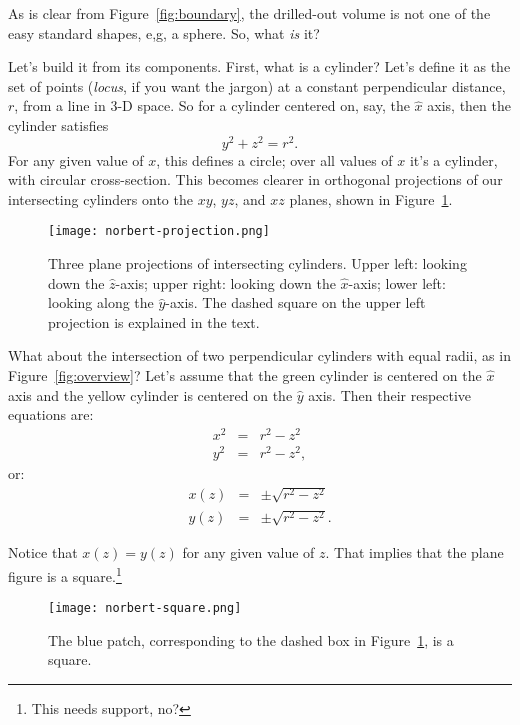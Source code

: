 \documentclass[twocolumn]{article}
\theoremstyle{definition}
\theoremstyle{plain}
\begin{document}
As is clear from Figure~\ref{fig:boundary}, the drilled-out volume is
not one of the easy standard shapes, e,g, a sphere.  So, what
\emph{is} it?

Let's build it from its components.  First, what is a cylinder?  Let's
define it as the set of points (\emph{locus}, if you want the jargon)
at a constant perpendicular distance, $r$, from a line in 3-D space.
So for a cylinder centered on, say, the $\hat{x}$ axis, then the
cylinder satisfies
\begin{equation}
  y^2 + z^2 = r^2.
\end{equation}
\label{eq:cylinder}
For any given value of $x$, this defines a circle; over all values of
$x$ it's a cylinder, with circular cross-section.
This becomes clearer in orthogonal projections of our intersecting
cylinders onto the $xy$, $yz$, and $xz$ planes, shown in
Figure~\ref{fig:projections}.
\begin{figure}
  \texttt{[image: norbert-projection.png]}
  \caption{Three plane projections of intersecting cylinders.  Upper
    left:  looking down the $\hat{z}$-axis; upper right:  looking down
    the $\hat{x}$-axis; lower left:  looking along the
    $\hat{y}$-axis.  The dashed square on the upper left projection is
    explained in the text.}
  \label{fig:projections}
\end{figure}

What about the intersection of two perpendicular cylinders with equal
radii, as in Figure~\ref{fig:overview}?  Let's assume that the green
cylinder is centered on the $\hat{x}$ axis and the yellow cylinder is
centered on the $\hat{y}$ axis.  Then their respective equations are:
\begin{eqnarray*}
  x^2 & = & r^2 - z^2 \\
  y^2 & = & r^2 - z^2,
\end{eqnarray*}
or:
\begin{eqnarray}
  x(z) & = & \pm \sqrt{r^2 - z^2} \label{eq:x(z)} \\
  y(z) & = & \pm \sqrt{r^2 - z^2}. \label{eq:y(z)}
\end{eqnarray}

Notice that $x(z) = y(z)$ for any given value of $z$.  That implies
that the plane figure is a square.\footnote{This needs support, no?}

\begin{figure}
  \texttt{[image: norbert-square.png]}
  \caption{The blue patch, corresponding to the dashed box in
    Figure~\ref{fig:projections}, is a square.}
  \label{fig:square}
\end{figure}
\end{document}
